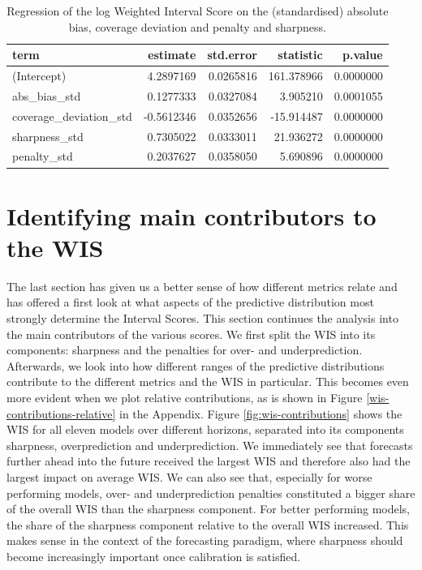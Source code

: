 \documentclass[
]{book}
\begin{document}
\begin{table}

\caption{\label{tab:regression-wis-metrics}Regression of the log Weighted Interval Score on the (standardised) absolute bias, coverage deviation and penalty and sharpness.}
\centering
\begin{tabular}[t]{lrrrr}
\toprule
term & estimate & std.error & statistic & p.value\\
\midrule
(Intercept) & 4.2897169 & 0.0265816 & 161.378966 & 0.0000000\\
abs\_bias\_std & 0.1277333 & 0.0327084 & 3.905210 & 0.0001055\\
coverage\_deviation\_std & -0.5612346 & 0.0352656 & -15.914487 & 0.0000000\\
sharpness\_std & 0.7305022 & 0.0333011 & 21.936272 & 0.0000000\\
penalty\_std & 0.2037627 & 0.0358050 & 5.690896 & 0.0000000\\
\bottomrule
\end{tabular}
\end{table}

\hypertarget{contributors}{%
\section{Identifying main contributors to the WIS}\label{contributors}}

The last section has given us a better sense of how different metrics relate and has offered a first look at what aspects of the predictive distribution most strongly determine the Interval Scores. This section continues the analysis into the main contributors of the various scores. We first split the WIS into its components: sharpness and the penalties for over- and underprediction. Afterwards, we look into how different ranges of the predictive distributions contribute to the different metrics and the WIS in particular. This becomes even more evident when we plot relative contributions, as is shown in Figure \ref{wis-contributions-relative} in the Appendix. Figure \ref{fig:wis-contributions} shows the WIS for all eleven models over different horizons, separated into its components sharpness, overprediction and underprediction. We immediately see that forecasts further ahead into the future received the largest WIS and therefore also had the largest impact on average WIS. We can also see that, especially for worse performing models, over- and underprediction penalties constituted a bigger share of the overall WIS than the sharpness component. For better performing models, the share of the sharpness component relative to the overall WIS increased. This makes sense in the context of the forecasting paradigm, where sharpness should become increasingly important once calibration is satisfied.
\end{document}
